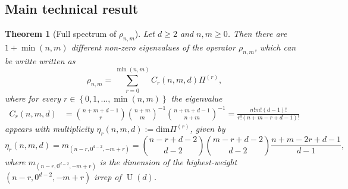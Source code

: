 \documentclass[aps,twocolumn,pra,superscriptaddress,nofootinbib]{revtex4-2}
\newtheorem{thm}{Theorem}
\newcommand{\sumab}[2]{\underset{#1}{\overset{#2}{\sum}}}
\newcommand{\set}[1]{\left\{#1\right\}}
\DeclareMathOperator{\U}{U}
\begin{document}
\subsection{Main technical result}

\begin{thm}[Full spectrum of $\rho_{n,m}$] Let $d \geq 2$ and $n,m \geq 0$. Then there are $1+\min(n,m)$ different non-zero eigenvalues of the operator $\rho_{n,m}$, which can be writte written as
\begin{equation}
    \rho_{n,m} = \sumab{r=0}{\min(n,m)} C_{r}(n,m,d)\Pi^{(r)}, 
\end{equation}
where for every $r \in \set{0,1,\dots,\min(n,m)}$ the eigenvalue
\begin{align}
    C_r(n,m,d) &= \binom{n+m+d-1}{r} {\binom{n+m}{m}}^{-1} {\binom{n+m+d-1}{n+m}}^{-1} = \frac{n!m!(d-1)!}{r!(n+m-r+d-1)!}
\end{align}
appears with multiplicity $\eta_r(n,m,d) := \mathrm{dim} \Pi^{(r)}$, given by
\begin{equation}
    \eta_r(n,m,d) = m_{(n-r,0^{d-2},-m+r)} = \binom{n-r+d-2}{d-2} \binom{m-r+d-2}{d-2} \frac{n+m-2r+d-1}{d-1},
\end{equation}
where $m_{(n-r,0^{d-2},-m+r)}$ is the dimension of the highest-weight $(n-r,0^{d-2},-m+r)$ irrep of $\U(d)$.
\end{thm}
\end{document}

